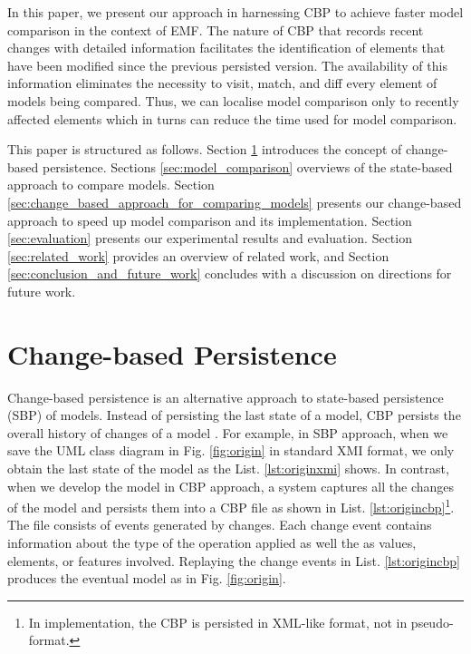 \documentclass{jot}
\begin{document}
In this paper, we present our approach in harnessing CBP to achieve faster model comparison in the context of EMF. The nature of CBP that records recent changes with detailed information facilitates the identification of elements that have been modified since the previous persisted version. The availability of this information eliminates the necessity to visit, match, and diff every element of models being compared. Thus, we can localise model comparison only to recently affected elements which in turns can reduce the time used for model comparison.

This paper is structured as follows. Section \ref{sec:change-based_persistence} introduces the concept of change-based persistence. Sections \ref{sec:model_comparison} overviews of the state-based approach to compare models. Section \ref{sec:change_based_approach_for_comparing_models} presents our change-based approach to speed up model comparison and its implementation. Section \ref{sec:evaluation} presents our experimental results and evaluation. Section \ref{sec:related_work} provides an overview of related work, and Section \ref{sec:conclusion_and_future_work} concludes with a discussion on directions for future work.

\vspace{-10pt}
\section{Change-based Persistence}
\label{sec:change-based_persistence}

\vspace{-5pt}
Change-based persistence is an alternative approach to state-based persistence (SBP) of models. Instead of persisting the last state of a model, CBP persists the overall history of changes of a model \cite{yohannis2018towards}. For example, in SBP approach, when we save the UML class diagram in Fig. \ref{fig:origin} in standard XMI format, we only obtain the last state of the model as the List. \ref{lst:originxmi} shows. In contrast, when we develop the model in CBP approach, a system captures all the changes of the model and persists them into a CBP file as shown in List. \ref{lst:origincbp}\footnote{In implementation, the CBP is persisted in XML-like format, not in pseudo-format.}. The file consists of events generated by changes. Each change event contains information about the type of the operation applied as well the as values, elements, or features involved. Replaying the change events in List. \ref{lst:origincbp} produces the eventual model as in Fig. \ref{fig:origin}.
\end{document}
